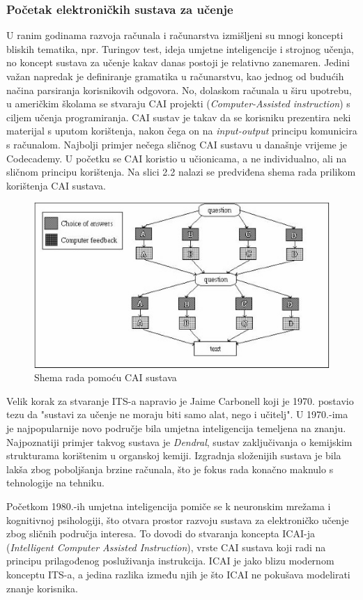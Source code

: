 \documentclass[times, utf8, zavrsni, numeric]{fer}
\begin{document}
\subsubsection{Početak elektroničkih sustava za učenje}
U ranim godinama razvoja računala i računarstva izmišljeni su mnogi koncepti bliskih tematika, npr. Turingov test, ideja umjetne inteligencije i strojnog učenja, no koncept sustava za učenje kakav danas postoji je relativno zanemaren. Jedini važan napredak je definiranje gramatika u računarstvu, kao jednog od budućih načina parsiranja korisnikovih odgovora. No, dolaskom računala u širu upotrebu, u američkim školama se stvaraju CAI  projekti (\textit{Computer-Assisted instruction}) s ciljem učenja programiranja. CAI sustav je takav da se korisniku prezentira neki materijal s uputom korištenja, nakon čega on na \textit{input-output} principu komunicira s računalom. Najbolji primjer nečega sličnog CAI sustavu u današnje vrijeme je Codecademy. U početku se CAI koristio u učionicama, a ne individualno, ali na sličnom principu korištenja.\citep{markurban} Na slici 2.2 nalazi se predviđena shema rada prilikom korištenja CAI sustava.

\begin{figure}[htb]
	\centering
	\includegraphics[]{img/CAI_shema.jpg}
	\caption{Shema rada pomoću CAI sustava\citep{caipic}}
	\label{fig:cai}
\end{figure}

\par
Velik korak za stvaranje ITS-a napravio je Jaime Carbonell koji je 1970. postavio tezu da "sustavi za učenje ne moraju biti samo alat, nego i učitelj".\citep{peters} U 1970.-ima je najpopularnije novo područje bila umjetna inteligencija temeljena na znanju. Najpoznatiji primjer takvog sustava je \textit{Dendral}, sustav zaključivanja o kemijskim strukturama korištenim u organskoj kemiji.\citep{dendral} Izgradnja složenijih sustava je bila lakša zbog poboljšanja brzine računala, što je fokus rada konačno maknulo s tehnologije na tehniku. 
\par
Početkom 1980.-ih umjetna inteligencija pomiče se k neuronskim mrežama i kognitivnoj psihologiji, što otvara prostor razvoju sustava za elektroničko učenje zbog sličnih područja interesa. To dovodi do stvaranja koncepta ICAI-ja (\textit{Intelligent Computer Assisted Instruction}), vrste CAI sustava koji radi na principu prilagođenog posluživanja instrukcija. ICAI je jako blizu modernom konceptu ITS-a, a jedina razlika između njih je što ICAI ne pokušava modelirati znanje korisnika.\citep{markurban}
\end{document}

